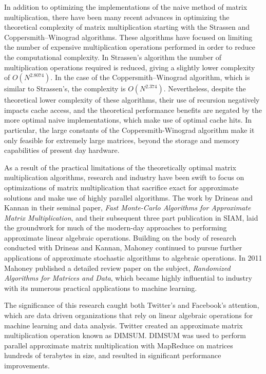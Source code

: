 \documentclass[oneside]{article}
\begin{document}
In addition to optimizing the implementations of the naive method of matrix multiplication, there have been many recent advances in optimizing the theoretical complexity of matrix multiplication starting with the Strassen and Coppersmith–Winograd algorithms\cite{huss1996implementation, coppersmith1987matrix}. These algorithms have focused on limiting the number of expensive multiplication operations performed in order to reduce the computational complexity. In Strassen's algorithm the number of multiplication operations required is reduced, giving a slightly lower complexity of $O(N^{2.8074})$\cite{huss1996implementation}. In the case of the Coppersmith–Winograd algorithm, which is similar to Strassen's, the complexity is $O(N^{2.374})$\cite{stothers2010complexity}. Nevertheless, despite the theoretical lower complexity of these algorithms, their use of recursion negatively impacts cache access, and the theoretical performance benefits are negated by the more optimal naive implementations, which make use of optimal cache hits\cite{note2002reducing}. In particular, the large constants of the Coppersmith-Winograd algorithm make it only feasible for extremely large matrices, beyond the storage and memory capabilities of present day hardware\cite{robinson2005toward}.

As a result of the practical limitations of the theoretically optimal matrix multiplication algorithms, research and industry have been swift to focus on optimizations of matrix multiplication that sacrifice exact for approximate solutions and make use of highly parallel algorithms. The work by Drineas and Kannan in their seminal paper, \emph{Fast Monte-Carlo Algorithms for Approximate Matrix Multiplication}\cite{drineas2001fast}, and their subsequent three part publication in SIAM\cite{drineas2006fastI, drineas2006fastII, drineas2006fastIII}, laid the groundwork for much of the modern-day approaches to performing approximate linear algebraic operations. Building on the body of research conducted with Drineas and Kannan, Mahoney continued to pursue further applications of approximate stochastic algorithms to algebraic operations. In 2011 Mahoney published a detailed review paper on the subject, \emph{Randomized Algorithms for Matrices and Data}\cite{mahoney2011randomized}, which became highly influential to industry with its numerous practical applications to machine learning.

The significance of this research caught both Twitter's and Facebook's attention, which are data driven organizations that rely on linear algebraic operations for machine learning and data analysis. Twitter created an approximate matrix multiplication operation known as DIMSUM. DIMSUM was used to perform parallel approximate matrix multiplication with MapReduce on matrices hundreds of terabytes in size, and resulted in significant performance improvements\cite{zadeh2013dimension}.
\end{document}
